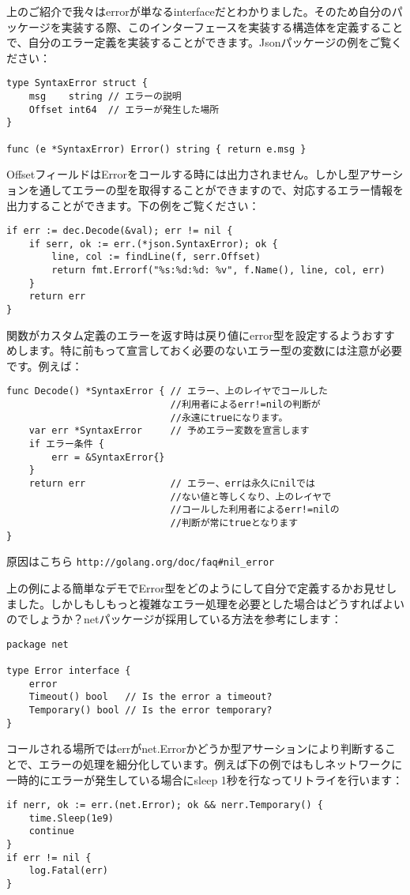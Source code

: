上のご紹介で我々はerrorが単なるinterfaceだとわかりました。そのため自分のパッケージを実装する際、このインターフェースを実装する構造体を定義することで、自分のエラー定義を実装することができます。Jsonパッケージの例をご覧ください：

\begin{lstlisting}[numbers=none]
type SyntaxError struct {
    msg    string // エラーの説明
    Offset int64  // エラーが発生した場所
}

func (e *SyntaxError) Error() string { return e.msg }
\end{lstlisting}

OffsetフィールドはErrorをコールする時には出力されません。しかし型アサーションを通してエラーの型を取得することができますので、対応するエラー情報を出力することができます。下の例をご覧ください：

\begin{lstlisting}[numbers=none]
if err := dec.Decode(&val); err != nil {
    if serr, ok := err.(*json.SyntaxError); ok {
        line, col := findLine(f, serr.Offset)
        return fmt.Errorf("%s:%d:%d: %v", f.Name(), line, col, err)
    }
    return err
}
\end{lstlisting}

関数がカスタム定義のエラーを返す時は戻り値にerror型を設定するようおすすめします。特に前もって宣言しておく必要のないエラー型の変数には注意が必要です。例えば：


\begin{lstlisting}[numbers=none]
func Decode() *SyntaxError { // エラー、上のレイヤでコールした
                             //利用者によるerr!=nilの判断が
                             //永遠にtrueになります。
    var err *SyntaxError     // 予めエラー変数を宣言します
    if エラー条件 {
        err = &SyntaxError{}
    }
    return err               // エラー、errは永久にnilでは
                             //ない値と等しくなり、上のレイヤで
                             //コールした利用者によるerr!=nilの
                             //判断が常にtrueとなります
}
\end{lstlisting}

原因はこちら \texttt{http://golang.org/doc/faq\#nil\_error}

上の例による簡単なデモでError型をどのようにして自分で定義するかお見せしました。しかしもしもっと複雑なエラー処理を必要とした場合はどうすればよいのでしょうか？netパッケージが採用している方法を参考にします：

\begin{lstlisting}[numbers=none]
package net

type Error interface {
    error
    Timeout() bool   // Is the error a timeout?
    Temporary() bool // Is the error temporary?
}
\end{lstlisting}

コールされる場所ではerrがnet.Errorかどうか型アサーションにより判断することで、エラーの処理を細分化しています。例えば下の例ではもしネットワークに一時的にエラーが発生している場合にsleep 1秒を行なってリトライを行います：

\begin{lstlisting}[numbers=none]
if nerr, ok := err.(net.Error); ok && nerr.Temporary() {
    time.Sleep(1e9)
    continue
}
if err != nil {
    log.Fatal(err)
}
\end{lstlisting}
